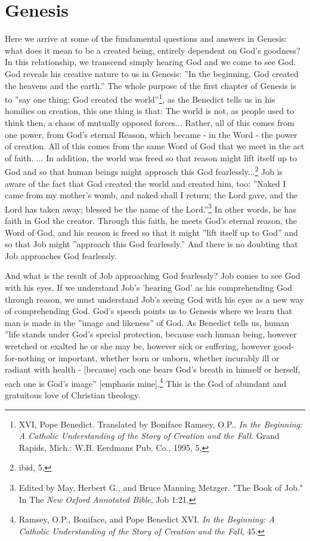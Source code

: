         \section{Genesis}
Here we arrive at some of the fundamental questions and answers in Genesis: what does it mean to be a created being, entirely dependent on God's goodness? In this relationship, we transcend simply hearing God and we come to see God. God reveals his creative nature to us in Genesis: ''In the beginning, God created the heavens and the earth.'' The whole purpose of the first chapter of Genesis is to ''say one thing: God created the world''\footnote{XVI, Pope Benedict. Translated by Boniface Ramsey, O.P.. \emph{In the Beginning: A Catholic Understanding of the Story of Creation and the Fall}. Grand Rapids, Mich.: W.B. Eerdmans Pub. Co., 1995, 5.}, as the Benedict tells us in his homilies on creation, this one thing is that: 
The world is not, as people used to think then, a chaos of mutually opposed forces... Rather, all of this comes from one power, from God's eternal Reason, which became - in the Word - the power of creation. All of this comes from the same Word of God that we meet in the act of faith. ... In addition, the world was freed so that reason might lift itself up to God and so that human beings might approach this God fearlessly...\footnote{ibid, 5.}
Job is aware of the fact that God created the world and created him, too: ''Naked I came from my mother's womb, and naked shall I return; the Lord gave, and the Lord has taken away; blessed be the name of the Lord.''\footnote{Edited by May, Herbert G., and Bruce Manning Metzger. "The Book of Job." In The \emph{New Oxford Annotated Bible}, Job 1:21.} In other words, he has faith in God the creator. Through this faith, he meets God's eternal reason, the Word of God, and his reason is freed so that it might ''lift itself up to God'' and so that Job might ''approach this God fearlessly.'' And there is no doubting that Job approaches God fearlessly.

And what is the result of Job approaching God fearlessly? Job comes to see God with his eyes. If we understand Job's 'hearing God' as his comprehending God through reason, we must understand Job's seeing God with his eyes as a new way of comprehending God. God's speech points us to Genesis where we learn that man is made in the ''image and likeness'' of God. As Benedict tells us, human ''life stands under God's special protection, because each human being, however wretched or exalted he or she may be, however sick or suffering, however good-for-nothing or important, whether born or unborn, whether incurably ill or radiant with health - [because] each one bears God's breath in himself or herself, each one is God's image'' [emphasis mine].\footnote{Ramsey, O.P., Boniface, and Pope Benedict XVI. \emph{In the Beginning: A Catholic Understanding of the Story of Creation and the Fall}, 45.} This is the God of abundant and gratuitous love of Christian theology.

